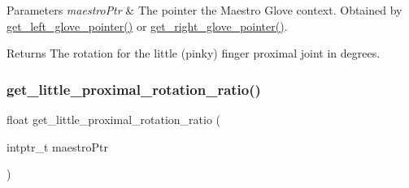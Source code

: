 \begin{DoxyParams}{Parameters}
{\em maestro\+Ptr} & The pointer the Maestro Glove context. Obtained by \hyperlink{group__glove_management_ga63ce3c99d4a8b8db851b22af9185764e}{get\+\_\+left\+\_\+glove\+\_\+pointer()} or \hyperlink{group__glove_management_ga9b8fd9d91aeac3f8da50f7a7eba0c32b}{get\+\_\+right\+\_\+glove\+\_\+pointer()}. \\
\hline
\end{DoxyParams}
\begin{DoxyReturn}{Returns}
The rotation for the little (pinky) finger proximal joint in degrees. 
\end{DoxyReturn}
\mbox{\label{group__rotation_access_gad356c1f99c4dbb4631a28f0cf8e654b5}} 
\subsubsection{\texorpdfstring{get\+\_\+little\+\_\+proximal\+\_\+rotation\+\_\+ratio()}{get\_little\_proximal\_rotation\_ratio()}}
{\footnotesize\ttfamily float get\+\_\+little\+\_\+proximal\+\_\+rotation\+\_\+ratio (\begin{DoxyParamCaption}\item[{intptr\+\_\+t}]{maestro\+Ptr }\end{DoxyParamCaption})}


